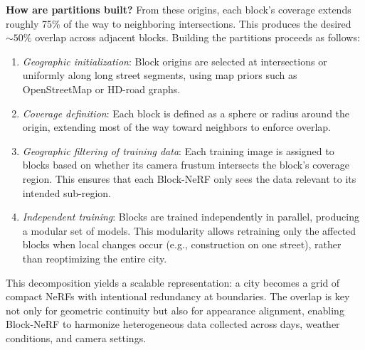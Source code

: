 \begin{enrichment}
\begin{enrichment}
        \textbf{How are partitions built?} From these origins, each block’s coverage extends roughly 75\% of the way to neighboring intersections. This produces the desired $\sim 50\%$ overlap across adjacent blocks. Building the partitions proceeds as follows:
        \begin{enumerate}
            \item \emph{Geographic initialization}: Block origins are selected at intersections or uniformly along long street segments, using map priors such as OpenStreetMap or HD-road graphs.
            \item \emph{Coverage definition}: Each block is defined as a sphere or radius around the origin, extending most of the way toward neighbors to enforce overlap.
            
            \newpage
            
            \item \emph{Geographic filtering of training data}: Each training image is assigned to blocks based on whether its camera frustum intersects the block’s coverage region. This ensures that each Block-NeRF only sees the data relevant to its intended sub-region.
            \item \emph{Independent training}: Blocks are trained independently in parallel, producing a modular set of models. This modularity allows retraining only the affected blocks when local changes occur (e.g., construction on one street), rather than reoptimizing the entire city.
        \end{enumerate}
        
        This decomposition yields a scalable representation: a city becomes a grid of compact NeRFs with intentional redundancy at boundaries. The overlap is key not only for geometric continuity but also for appearance alignment, enabling Block-NeRF to harmonize heterogeneous data collected across days, weather conditions, and camera settings. 
        

\end{enrichment}
\end{enrichment}
